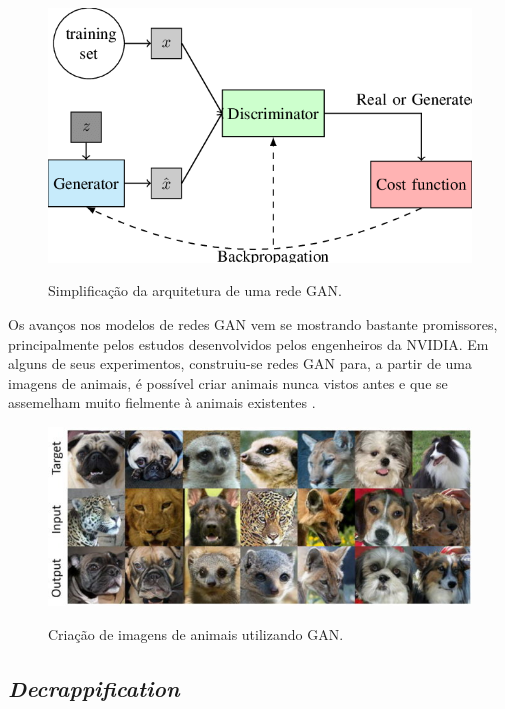 \begin{figure}[H]
  \centering
  \caption{Simplificação da arquitetura de uma rede GAN.}
  \includegraphics[scale=0.5]{figuras/gans.png}
  \label{fig:gans}
\end{figure}

Os avanços nos modelos de redes GAN vem se mostrando bastante promissores, principalmente pelos estudos desenvolvidos pelos engenheiros da NVIDIA. Em alguns de seus experimentos, construiu-se redes GAN para, a partir de uma imagens de animais, é possível criar animais nunca vistos antes e que se assemelham muito fielmente à animais existentes \cite{gans-on-animals}.

\begin{figure}[H]
  \centering
  \caption{Criação de imagens de animais utilizando GAN.}
  \includegraphics[scale=0.8]{figuras/gans-on-animals.jpg}
  \label{fig:gans-on-animals}
\end{figure}


\subsection{\textit{Decrappification}}

